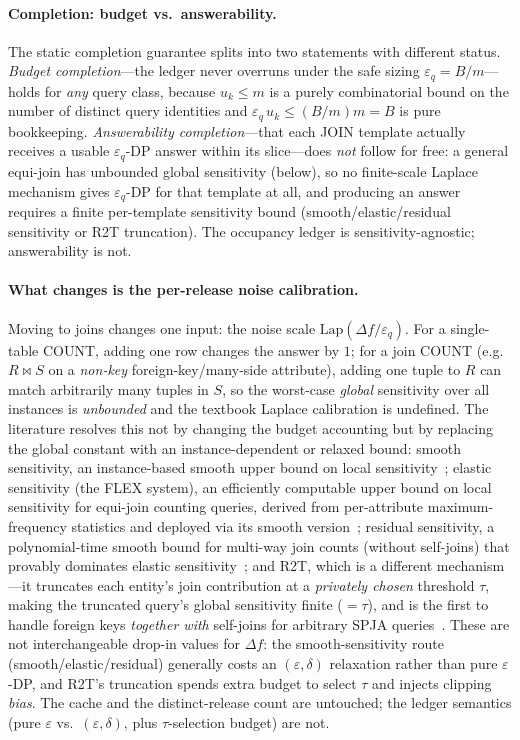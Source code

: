\documentclass[sigconf,nonacm]{acmart}
\newcommand{\eps}{\varepsilon}
\newcommand{\Lap}{\mathrm{Lap}}
\begin{document}
\paragraph{Completion: budget vs.\ answerability.}
The static completion guarantee splits into two statements with different status. \emph{Budget completion}---the ledger never overruns under the safe sizing $\eps_q=B/m$---holds for \emph{any} query class, because $u_k\le m$ is a purely combinatorial bound on the number of distinct query identities and $\eps_q\,u_k\le(B/m)m=B$ is pure bookkeeping. \emph{Answerability completion}---that each JOIN template actually receives a usable $\eps_q$-DP answer within its slice---does \emph{not} follow for free: a general equi-join has unbounded global sensitivity (below), so no finite-scale Laplace mechanism gives $\eps_q$-DP for that template at all, and producing an answer requires a finite per-template sensitivity bound (smooth/elastic/residual sensitivity or R2T truncation). The occupancy ledger is sensitivity-agnostic; answerability is not.

\paragraph{What changes is the per-release noise calibration.}
Moving to joins changes one input: the noise scale $\Lap(\Delta f/\eps_q)$. For a single-table COUNT, adding one row changes the answer by $1$; for a join COUNT (e.g.\ $R\bowtie S$ on a \emph{non-key} foreign-key/many-side attribute), adding one tuple to $R$ can match arbitrarily many tuples in $S$, so the worst-case \emph{global} sensitivity over all instances is \emph{unbounded} and the textbook Laplace calibration is undefined. The literature resolves this not by changing the budget accounting but by replacing the global constant with an instance-dependent or relaxed bound: smooth sensitivity, an instance-based smooth upper bound on local sensitivity~\cite{nissim2007smooth}; elastic sensitivity (the FLEX system), an efficiently computable upper bound on local sensitivity for equi-join counting queries, derived from per-attribute maximum-frequency statistics and deployed via its smooth version~\cite{johnson2018towards}; residual sensitivity, a polynomial-time smooth bound for multi-way join counts (without self-joins) that provably dominates elastic sensitivity~\cite{dong2021residual}; and R2T, which is a different mechanism---it truncates each entity's join contribution at a \emph{privately chosen} threshold $\tau$, making the truncated query's global sensitivity finite ($=\tau$), and is the first to handle foreign keys \emph{together with} self-joins for arbitrary SPJA queries~\cite{dong2022r2t}. These are not interchangeable drop-in values for $\Delta f$: the smooth-sensitivity route (smooth/elastic/residual) generally costs an $(\eps,\delta)$ relaxation rather than pure $\eps$-DP, and R2T's truncation spends extra budget to select $\tau$ and injects clipping \emph{bias}. The cache and the distinct-release count are untouched; the ledger semantics (pure $\eps$ vs.\ $(\eps,\delta)$, plus $\tau$-selection budget) are not.
\end{document}
